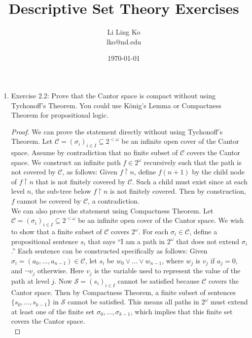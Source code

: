 \documentclass{article}
\begin{document}
\title{Descriptive Set Theory Exercises}
\author{Li Ling Ko\\ lko@nd.edu}
\date{\today}
\maketitle

\begin{enumerate}
  \item Exercise 2.2: Prove that the Cantor space is compact without using
    Tychonoff's Theorem. You could use K\"{o}nig's Lemma or Compactness Theorem
    for propositional logic.
    \begin{proof}
      We can prove the statement directly without using Tychonoff's
      Theorem. Let $\mathcal{C}=(\sigma_i)_{i\in I}\subseteq 2^{<\omega}$
      be an infinite open cover of the Cantor space. Assume by
      contradiction that no finite subset of $\mathcal{C}$ covers the
      Cantor space. We construct an infinite path $f\in 2^\omega$
      recursively such that the path is not covered by $\mathcal{C}$, as
      follows: Given $f\upharpoonright n$, define $f(n+1)$ by the child
      node of $f\upharpoonright n$ that is not finitely covered by
      $\mathcal{C}$.  Such a child must exist since at each level $n$, the
      sub-tree below $f\upharpoonright n$ is not finitely covered. Then by
      construction, $f$ cannot be covered by $\mathcal{C}$, a
      contradiction. \\

      We can also prove the statement using Compactness Theorem. Let
      $\mathcal{C}=(\sigma_i)_{i\in I}\subseteq 2^{<\omega}$ be an infinite
      open cover of the Cantor space. We wish to show that a finite subset
      of $\mathcal{C}$ covers $2^{\omega}$. For each
      $\sigma_i\in\mathcal{C}$, define a propositional sentence $s_i$ that
      says ``I am a path in $2^\omega$ that does not extend $\sigma_i$.''
      Each sentence can be constructed specifically as follows: Given
      $\sigma_i=(a_0,\ldots,a_{n-1})\in\mathcal{C}$, let $s_i$ be
      $w_0\vee\ldots\vee w_{n-1}$, where $w_j$ is $v_j$ if $a_j=0$, and
      $\neg v_j$ otherwise. Here $v_j$ is the variable used to represent
      the value of the path at level $j$. Now $\mathcal{S}=(s_i)_{i\in
      I}$ cannot be satisfied because $\mathcal{C}$ covers the Cantor
      space. Then by Compactness Theorem, a finite subset of sentences
      $\{s_0,\ldots,s_{k-1}\}$ in $\mathcal{S}$ cannot be satisfied. This
      means all paths in $2^\omega$ must extend at least one of the finite
      set $\sigma_0,\ldots,\sigma_{k-1}$, which implies that this finite set
      covers the Cantor space. \\


\end{proof}
\end{enumerate}
\end{document}
